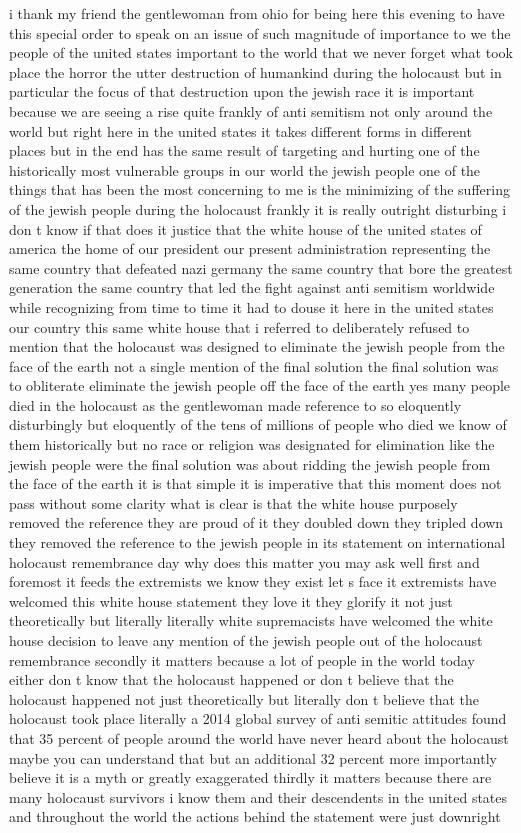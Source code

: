 \documentclass{article}
\begin{document}
i thank my friend the gentlewoman from ohio for being here this evening to have this special order to speak on an issue of such magnitude of importance to we the people of the united states important to the world that we never forget what took place the horror the utter destruction of humankind during the holocaust but in particular the focus of that destruction upon the jewish race it is important because we are seeing a rise quite frankly of anti semitism not only around the world but right here in the united states it takes different forms in different places but in the end has the same result of targeting and hurting one of the historically most vulnerable groups in our world the jewish people one of the things that has been the most concerning to me is the minimizing of the suffering of the jewish people during the holocaust frankly it is really outright disturbing i don t know if that does it justice that the white house of the united states of america the home of our president our present administration representing the same country that defeated nazi germany the same country that bore the greatest generation the same country that led the fight against anti semitism worldwide while recognizing from time to time it had to douse it here in the united states our country this same white house that i referred to deliberately refused to mention that the holocaust was designed to eliminate the jewish people from the face of the earth not a single mention of the final solution the final solution was to obliterate eliminate the jewish people off the face of the earth yes many people died in the holocaust as the gentlewoman made reference to so eloquently disturbingly but eloquently of the tens of millions of people who died we know of them historically but no race or religion was designated for elimination like the jewish people were the final solution was about ridding the jewish people from the face of the earth it is that simple it is imperative that this moment does not pass without some clarity what is clear is that the white house purposely removed the reference they are proud of it they doubled down they tripled down they removed the reference to the jewish people in its statement on international holocaust remembrance day why does this matter you may ask well first and foremost it feeds the extremists we know they exist let s face it extremists have welcomed this white house statement they love it they glorify it not just theoretically but literally literally white supremacists have welcomed the white house decision to leave any mention of the jewish people out of the holocaust remembrance secondly it matters because a lot of people in the world today either don t know that the holocaust happened or don t believe that the holocaust happened not just theoretically but literally don t believe that the holocaust took place literally a 2014 global survey of anti semitic attitudes found that 35 percent of people around the world have never heard about the holocaust maybe you can understand that but an additional 32 percent more importantly believe it is a myth or greatly exaggerated thirdly it matters because there are many holocaust survivors i know them and their descendents in the united states and throughout the world the actions behind the statement were just downright 
\end{document}
